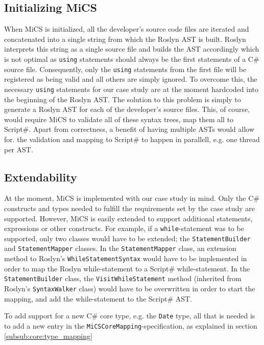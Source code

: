 \subsection{Initializing MiCS} %
\label{ssub:collecting_source_code}
When MiCS is initialized, all the developer's source code files are iterated and concatenated into a single string from which the Roslyn AST is built. Roslyn interprets this string as a single source file and builds the AST accordingly which is not optimal as \texttt{using} statements should always be the first statements of a C\# source file. Consequently, only the \texttt{using} statements from the first file will be registered as being valid and all others are simply ignored. To overcome this, the necessary \texttt{using} statements for our case study are at the moment hardcoded into the beginning of the Roslyn AST. The solution to this problem is simply to generate a Roslyn AST for each of the developer's source files. This, of course, would require MiCS to validate all of these syntax trees, map them all to Script\#. Apart from correctness, a benefit of having multiple ASTs would allow for. the validation and mapping to Script\# to happen in parallell, e.g. one thread per AST.

\subsection{Extendability} %
\label{sub:extendability}
At the moment, MiCS is implemented with our case study in mind. Only the C\# constructs and types needed to fulfill the requirements set by the case study are supported. However, MiCS is easily extended to support additional statements, expressions or other constructs. For example, if a \texttt{while}-statement was to be supported, only two classes would have to be extended; the \texttt{StatementBuilder} and \texttt{StatementMapper} classes. In the \texttt{StatementMapper} class, an extension method to Roslyn's \texttt{WhileStatementSyntax} would have to be implemented in order to map the Roslyn while-statement to a Script\# while-statement. In the \texttt{StatementBuilder} class, the \texttt{VisitWhileStatement} method (inherited from Roslyn's \texttt{SyntaxWalker} class) would have to be overwritten in order to start the mapping, and add the while-statement to the Script\# AST.

To add support for a new C\# core type, e.g. the \texttt{Date} type, all that is needed is to add a new entry in the \texttt{MiCSCoreMapping}-specification, as explained in section \ref{subsub:core:type_mapping}


